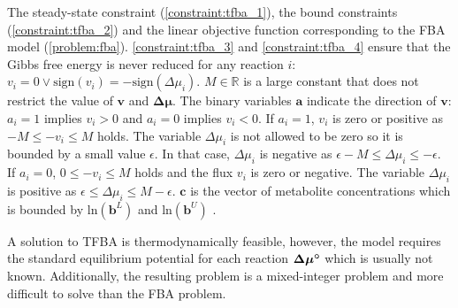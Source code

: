 \newpage
The steady-state constraint (\cref{constraint:tfba_1}), the bound constraints (\cref{constraint:tfba_2}) and the linear objective function corresponding to the \textsf{FBA} model (\cref{problem:fba}). \cref{constraint:tfba_3} and \cref{constraint:tfba_4} ensure that the Gibbs free energy is never reduced for any reaction $i$: $v_i = 0 \lor \text{sign}(v_i) = - \text{sign}(\Delta \mu_i)$. $M \in \mathbb{R}$ is a large constant that does not restrict the value of $\mathbf v$ and $\boldsymbol{\Delta \mu}$. The binary variables $\boldsymbol a$ indicate the direction of $\mathbf v$: $a_i=1$ implies $v_i>0$ and $a_i=0$ implies $v_i<0$. If $a_i=1$, $v_i$ is zero or positive as $-M \leq -v_i \leq M$ holds. The variable $\Delta \mu_i$ is not allowed to be zero so it is bounded by a small value $\epsilon$. In that case, $\Delta \mu_i$ is negative as $\epsilon - M \leq \Delta \mu_i \leq - \epsilon$. If $a_i=0$, $0 \leq -v_i \leq M$ holds and the flux $v_i$ is zero or negative. The variable $\Delta \mu_i$ is positive as $\epsilon \leq \Delta \mu_i \leq M - \epsilon$.
$\mathbf c$ is the vector of metabolite concentrations which is bounded by $\mathrm{ln}(\mathbf b^L)$ and $\mathrm{ln}(\mathbf b^U)$ \cite{noor_removing_2018}.

A solution to \textsf{TFBA} is thermodynamically feasible, however, the model requires the standard equilibrium potential for each reaction $\boldsymbol{\Delta \mu \degree}$ which is usually not known. Additionally, the resulting problem is a mixed-integer problem and more difficult to solve than the \textsf{FBA} problem.

